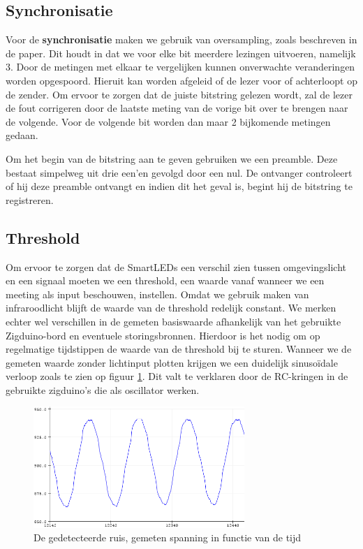 \documentclass{article}
\begin{document}
\subsection{Synchronisatie}\label{synch}

 Voor de \textbf{synchronisatie} maken we gebruik van oversampling, zoals beschreven in de paper. Dit houdt in dat we voor elke bit meerdere lezingen uitvoeren, namelijk 3. Door de metingen met elkaar te vergelijken kunnen onverwachte veranderingen worden opgespoord. Hieruit kan worden afgeleid of de lezer voor of achterloopt op de zender. Om ervoor te zorgen dat de juiste bitstring gelezen wordt, zal de lezer de fout corrigeren door de laatste meting van de vorige bit over te brengen naar de volgende. Voor de volgende bit worden dan maar 2 bijkomende metingen gedaan.
 
Om het begin van de bitstring aan te geven gebruiken we een preamble. Deze bestaat simpelweg uit drie een’en gevolgd door een nul. De ontvanger controleert of hij deze preamble ontvangt en indien dit het geval is, begint hij de bitstring te registreren.

\subsection{Threshold}

Om ervoor te zorgen dat de SmartLEDs een verschil zien tussen omgevingslicht en een signaal moeten we een threshold, een waarde vanaf wanneer we een meeting als input beschouwen, instellen. Omdat we gebruik maken van infraroodlicht blijft de waarde van de threshold redelijk constant. We merken echter wel verschillen in de gemeten basiswaarde afhankelijk van het gebruikte Zigduino-bord en eventuele storingsbronnen. Hierdoor is het nodig om op regelmatige tijdstippen de waarde van de threshold bij te sturen. 
Wanneer we de gemeten waarde zonder lichtinput plotten krijgen we een duidelijk sinusoïdale verloop zoals te zien op figuur \ref{fig:ruis}. Dit valt te verklaren door de RC-kringen in de gebruikte zigduino’s die als oscillator werken. \cite{oscillator}  

\begin{figure}[H]
\centering
\includegraphics[width=8cm]{ruis.png}
\caption{De gedetecteerde ruis, gemeten spanning in functie van de tijd}
\label{fig:ruis}
\end{figure}
\end{document}
